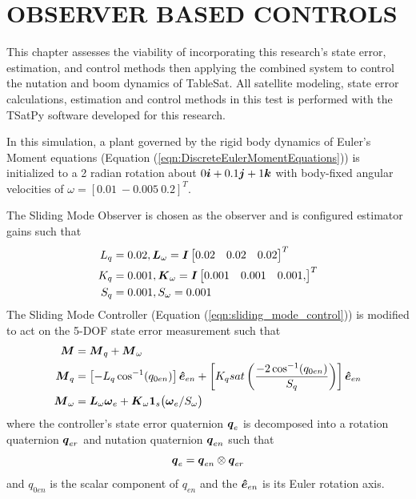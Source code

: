 
\chapter{OBSERVER BASED CONTROLS}
\label{chap:ObserverBasedControls}

This chapter assesses the viability of incorporating this research's state error, estimation, and control methods then applying the combined system to control the nutation and boom dynamics of TableSat.  All satellite modeling, state error calculations, estimation and control methods in this test is performed with the TSatPy software developed for this research.

In this simulation, a plant governed by the rigid body dynamics of Euler's Moment equations (Equation (\ref{eqn:DiscreteEulerMomentEquations})) is initialized to a 2 radian rotation about $0 \boldsymbol{i} +0.1 \boldsymbol{j} +1 \boldsymbol{k}$ with body-fixed angular velocities of $\omega = [0.01 \ -0.005 \ 0.2]^T$.

The Sliding Mode Observer is chosen as the observer and is configured estimator gains such that
\begin{equation}
  \begin{aligned}
    L_q &= 0.02, \boldsymbol{L}_{\omega} = \boldsymbol{I} \begin{bmatrix} 0.02 & 0.02 & 0.02 \end{bmatrix}^T \\
    K_q &= 0.001, \boldsymbol{K}_{\omega} = \boldsymbol{I} \begin{bmatrix} 0.001 & 0.001 & 0.001, \end{bmatrix}^T \\
    S_q &= 0.001, S_{\omega} = 0.001
  \end{aligned}
\end{equation}
The Sliding Mode Controller (Equation (\ref{eqn:sliding_mode_control})) is modified to act on the 5-DOF state error measurement such that
\begin{equation}
  \begin{aligned}
    \boldsymbol{M} &= \boldsymbol{M}_{q} + \boldsymbol{M}_{\omega} \\
    \boldsymbol{M}_{q} &= \left[- L_{q} \cos^{-1} (q_{0en}) \right] \boldsymbol{\hat{e}}_{en} + \left[ K_{q} sat \left( \frac{-2\cos^{-1} (q_{0en})}{S_q} \right) \right] \boldsymbol{\hat{e}}_{en} \\
    \boldsymbol{M}_{\omega} &= \boldsymbol{L}_{\omega} \boldsymbol{\omega}_e + \boldsymbol{K}_{\omega}\boldsymbol{1}_s \big(\boldsymbol{\omega}_e / S_{\omega} \big) \\
  \end{aligned}
\end{equation}
where the controller's state error quaternion $\boldsymbol{q}_e$ is decomposed into a rotation quaternion $\boldsymbol{q}_{er}$ and nutation quaternion  $\boldsymbol{q}_{en}$ such that
\begin{equation}
  \boldsymbol{q}_e = \boldsymbol{q}_{en} \otimes \boldsymbol{q}_{er}
\end{equation}
and $q_{0en}$ is the scalar component of $q_{en}$ and the $\boldsymbol{\hat{e}}_{en}$ is its Euler rotation axis.

